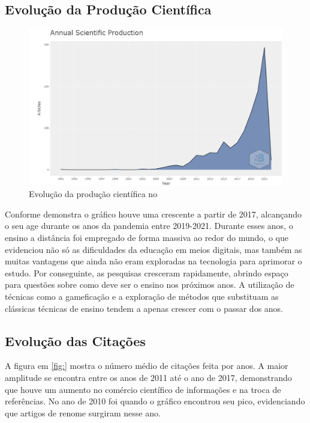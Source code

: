 \subsection{Evolução da Produção Científica}



\begin{figure}[ht]
    \centering
    \includegraphics[width=12cm]{experiments/MarcusABR/PesquisaBibliometrica/Imagens/newplot.png}
    \caption{Evolução da produção científica no \dataset\ }
    \label{fig:evolucao}
\end{figure}

Conforme demonstra o gráfico houve uma crescente a partir de 2017, alcançando o seu age durante os anos da pandemia entre 2019-2021. Durante esses anos, o ensino a distância foi empregado de forma massiva ao redor do mundo, o que evidenciou não só as dificuldades da educação em meios digitais, mas também as muitas vantagens que ainda não eram exploradas na tecnologia para aprimorar o estudo.
Por conseguinte, as pesquisas cresceram rapidamente, abrindo espaço para questões sobre como deve ser o ensino nos próximos anos. A utilização de técnicas como a gameficação e a exploração de métodos que substituam as clássicas técnicas de ensino tendem a apenas crescer com o passar dos anos.


\subsection{Evolução das Citações}


A figura em \ref{fig:} mostra o número médio de citações feita por anos. A maior amplitude se encontra entre os anos de 2011 até o ano de 2017, demonstrando que houve um aumento no comércio científico de informações e na troca de referências. No ano de 2010 foi quando o gráfico encontrou seu pico, evidenciando que artigos de renome surgiram nesse ano.

